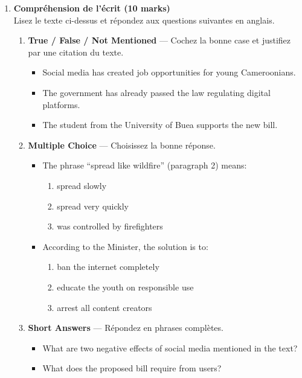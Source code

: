 \documentclass[11pt]{article}
\begin{document}
\begin{enumerate}
    \item \textbf{Compréhension de l'écrit (10 marks)} \\
    Lisez le texte ci-dessus et répondez aux questions suivantes en anglais.
    \begin{enumerate}
        \item \textbf{True / False / Not Mentioned} — Cochez la bonne case et justifiez par une citation du texte.
        \begin{itemize}
            \item[a)] Social media has created job opportunities for young Cameroonians.
            \item[b)] The government has already passed the law regulating digital platforms.
            \item[c)] The student from the University of Buea supports the new bill.
        \end{itemize}
        \item \textbf{Multiple Choice} — Choisissez la bonne réponse.
        \begin{itemize}
            \item[d)] The phrase “spread like wildfire” (paragraph 2) means:
            \begin{enumerate}
                \item spread slowly
                \item spread very quickly
                \item was controlled by firefighters
            \end{enumerate}
            \item[e)] According to the Minister, the solution is to:
            \begin{enumerate}
                \item ban the internet completely
                \item educate the youth on responsible use
                \item arrest all content creators
            \end{enumerate}
        \end{itemize}
        \item \textbf{Short Answers} — Répondez en phrases complètes.
        \begin{itemize}
            \item[f)] What are two negative effects of social media mentioned in the text?
            \item[g)] What does the proposed bill require from users?
        \end{itemize}
    \end{enumerate}


\end{enumerate}
\end{document}
